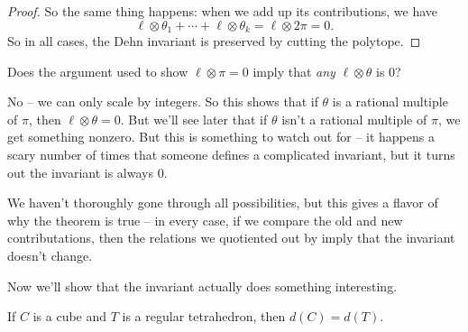 \begin{proof}
    So the same thing happens: when we add up its contributions, we have \[\ell \otimes \theta_1 + \cdots + \ell \otimes \theta_k = \ell \otimes 2\pi = 0.\] So in all cases, the Dehn invariant is preserved by cutting the polytope. 
\end{proof}

\begin{question}
Does the argument used to show $\ell \otimes \pi = 0$ imply that \emph{any} $\ell \otimes \theta$ is $0$?
\end{question}

\begin{ans}
No -- we can only scale by integers. So this shows that if $\theta$ is a rational multiple of $\pi$, then $\ell \otimes \theta = 0$. But we'll see later that if $\theta$ isn't a rational multiple of $\pi$, we get something nonzero. But this is something to watch out for -- it happens a scary number of times that someone defines a complicated invariant, but it turns out the invariant is always $0$. 
\end{ans}

\begin{note}
We haven't thoroughly gone through all possibilities, but this gives a flavor of why the theorem is true -- in every case, if we compare the old and new contributations, then the relations we quotiented out by imply that the invariant doesn't change. 
\end{note}

Now we'll show that the invariant actually does something interesting. 

\begin{theorem}
    If $C$ is a cube and $T$ is a regular tetrahedron, then $d(C) = d(T)$. 
\end{theorem}

